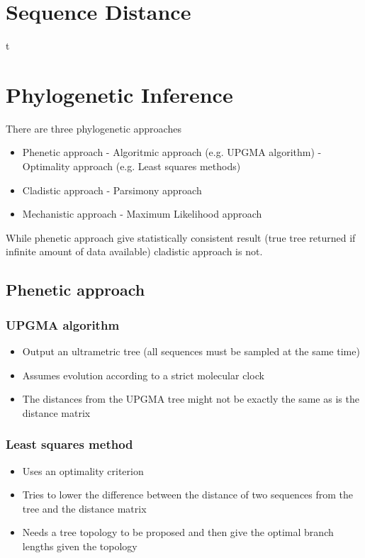 \documentclass{article}
\begin{document}
\begin{multicols*}{3}
\section{Sequence Distance}
t
\section{Phylogenetic Inference}
There are three phylogenetic approaches
\begin{itemize}
   \item Phenetic approach
   \newline
     - Algoritmic approach (e.g. UPGMA algorithm)
    \newline
     - Optimality approach (e.g. Least squares methods)
   \item Cladistic approach
    \newline
     - Parsimony approach
   \item Mechanistic approach
    \newline
     - Maximum Likelihood approach
\end{itemize}
While phenetic approach give statistically consistent result (true tree returned if infinite amount of data available) cladistic approach is not.

\subsection{Phenetic approach}
\subsubsection{UPGMA algorithm}
\begin{itemize}
    \item Output an ultrametric tree (all sequences must be sampled at the same time)
    \item Assumes evolution according to a strict molecular clock
    \item The distances from the UPGMA tree might not be exactly the same as is the distance matrix
\end{itemize}

\subsubsection{Least squares method}
\begin{itemize}
    \item Uses an optimality criterion
    \item Tries to lower the difference between the distance of two sequences from the tree and the distance matrix
    \item Needs a tree topology to be proposed and then give the optimal branch lengths given the topology
\end{itemize}


\end{multicols*}
\end{document}
